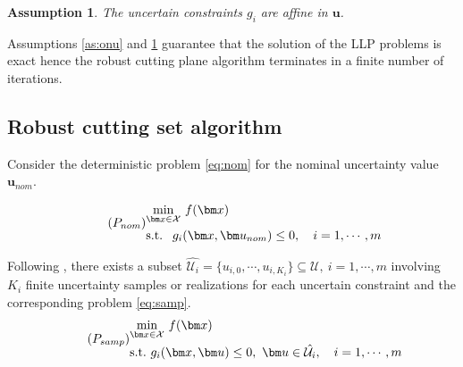 \documentclass[sn-mathphys-num]{sn-jnl}
\newtheorem{assumption}{Assumption}
\begin{document}
\begin{assumption}\label{as:gaff}
    The uncertain constraints $g_i$ are affine in $\bm u$.
\end{assumption}

Assumptions \ref{as:onu} and \ref{as:gaff} guarantee that the solution of the LLP problems is exact hence the robust cutting plane algorithm terminates in a finite number of iterations.

\subsection{Robust cutting set algorithm}
Consider the deterministic problem \eqref{eq:nom} for the nominal uncertainty value $\bm u_{nom}$.


\begin{equation}\tag{$P_{nom}$}\label{eq:nom}
\begin{aligned}
&\underset{\bm x\in \mathcal{X}}{\min}~f(\bm x)\\
&\text{s.t. }~ g_i(\bm x,\bm u_{nom})\leq 0, \quad i=1,\cdots,m
\end{aligned}
\end{equation}

Following \citet{Mutapcic2009}, there exists a subset $ \hat{\mathcal{U}_i}=\{ u_{i,0},\cdots, u_{i,K_i}\}\subseteq \mathcal{U},~ i=1,\cdots,m$ involving $K_i$ finite uncertainty samples or realizations for each uncertain constraint and the corresponding problem \ref{eq:samp}.   
\begin{equation}\tag{$P_{samp}$}\label{eq:samp}
\begin{aligned}
&\underset{\bm x\in \mathcal{X}}{\min}~f(\bm x)\\
&\text{s.t.}~ g_i(\bm x,\bm u)\leq 0,~ \bm u \in \hat{\mathcal{U}_i}, \quad i=1,\cdots,m
\end{aligned}
\end{equation}
\end{document}
